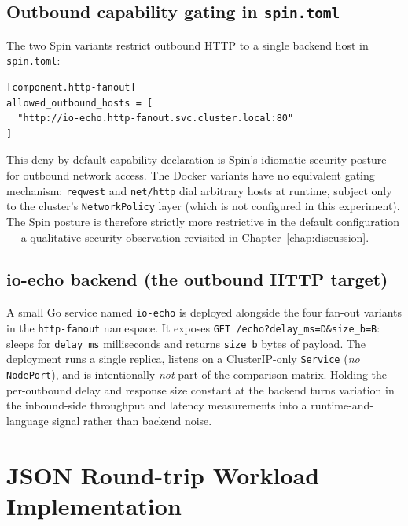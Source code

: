 \subsection{Outbound capability gating in \texttt{spin.toml}}

\begin{sloppypar}
The two Spin variants restrict outbound \acs{HTTP} to a single backend host in \texttt{spin.toml}:
\end{sloppypar}

\begin{verbatim}
[component.http-fanout]
allowed_outbound_hosts = [
  "http://io-echo.http-fanout.svc.cluster.local:80"
]
\end{verbatim}

\begin{sloppypar}
This deny-by-default capability declaration is Spin's idiomatic security posture for outbound network access. The Docker variants have no equivalent gating mechanism: \texttt{reqwest} and \texttt{net/http} dial arbitrary hosts at runtime, subject only to the cluster's \texttt{NetworkPolicy} layer (which is not configured in this experiment). The Spin posture is therefore strictly more restrictive in the default configuration --- a qualitative security observation revisited in Chapter~\ref{chap:discussion}.
\end{sloppypar}

\subsection{io-echo backend (the outbound HTTP target)}
\label{sec:impl_io_echo}

\begin{sloppypar}
A small Go service named \texttt{io-echo} is deployed alongside the four fan-out variants in the \texttt{http-fanout} namespace. It exposes \texttt{GET /echo?delay\_ms=D\&size\_b=B}: sleeps for \texttt{delay\_ms} milliseconds and returns \texttt{size\_b} bytes of payload. The deployment runs a single replica, listens on a ClusterIP-only \texttt{Service} (\textit{no} \texttt{NodePort}), and is intentionally \textit{not} part of the comparison matrix. Holding the per-outbound delay and response size constant at the backend turns variation in the inbound-side throughput and latency measurements into a runtime-and-language signal rather than backend noise.
\end{sloppypar}

\section{JSON Round-trip Workload Implementation}
\label{sec:impl_json_roundtrip}

